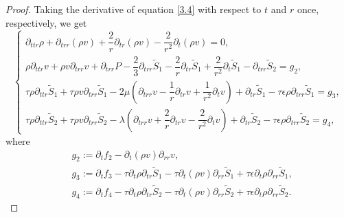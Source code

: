 \documentclass[10pt,reqno]{amsart}
\numberwithin{equation}{section}
\begin{document}
	\begin{proof}
		Taking the derivative of equation \eqref{3.4} with respect to $t$ and $r$ once, respectively, we get
		\begin{equation}\label{47}
			\begin{cases}
				\partial_{ttr} \rho+\partial_{trr}(\rho v)+\dfrac{2}{r} \partial_{tr}(\rho v)-\dfrac{2}{r^2} \partial_{t}(\rho v)=0, \\
				\rho\partial_{ttr} v+\rho v \partial_{trr} v+\partial_{trr} P-\dfrac{2}{3}\partial_{trr}  \tilde{S}_1-\dfrac{2}{r} \partial_{tr} \tilde{S}_1+\dfrac{2}{r^2}\partial_{t}\tilde{S}_1-\partial_{trr} \tilde{S}_2=g_2,\\
				\tau \rho \partial_{ttr} \tilde{S}_1+\tau \rho v \partial_{trr}\tilde{S}_1 
				-2\mu\left(\partial_{trr} v- \dfrac{1}{r}\partial_{tr} v
				+\dfrac{1}{r^2} \partial_{t}v \right)+\partial_{tr} \tilde{S}_1
				-\tau \epsilon\rho\partial_{trr}\tilde{S}_1
				= g_3, \\
				\tau  \rho \partial_{ttr} \tilde{S}_2+\tau  \rho v \partial_{trr}\tilde{S}_2
				-\lambda \left(\partial_{trr} v+\dfrac{2}{r}\partial_{tr} v-\dfrac{2}{r^2} \partial_{t}v\right)+\partial_{tr} \tilde{S}_2
				-\tau  \epsilon\rho\partial_{trr}\tilde{S}_2
				=g_4,
			\end{cases}
		\end{equation}
		where
		\begin{equation}
			\begin{aligned}\nonumber
				&g_2:=\partial_{t}f_2-\partial_{t}(\rho v)\partial_{rr} v,\\
				&g_3:=\partial_{t}f_3
				-\tau \partial_{t}\rho \partial_{tr} \tilde{S}_1
				-\tau \partial_{t}(\rho v) \partial_{rr}\tilde{S}_1
				+\tau \epsilon\partial_{t}\rho\partial_{rr}\tilde{S}_1,\\
				&g_4:=\partial_{t}f_4-\tau  \partial_{t}\rho \partial_{tr} \tilde{S}_2-\tau  \partial_{t}(\rho v) \partial_{rr}\tilde{S}_2
				+\tau  \epsilon\partial_{t}\rho\partial_{rr}\tilde{S}_2.
			\end{aligned}
		\end{equation}
		

\end{proof}
\end{document}

